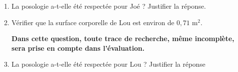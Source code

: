 \documentclass[10pt]{article}
\begin{document}
\begin{enumerate}
\item La posologie a-t-elle été respectée pour Joé ? Justifier la réponse. 
\item Vérifier que la surface corporelle de Lou est environ de $0,71$ m$^2$. 

\medskip

\textbf{Dans cette question, toute trace de recherche, même incomplète, sera prise en compte dans l'évaluation.}
 
\item La posologie a-t-elle été respectée pour Lou ? Justifier la réponse 
\end{enumerate}
\end{document}
